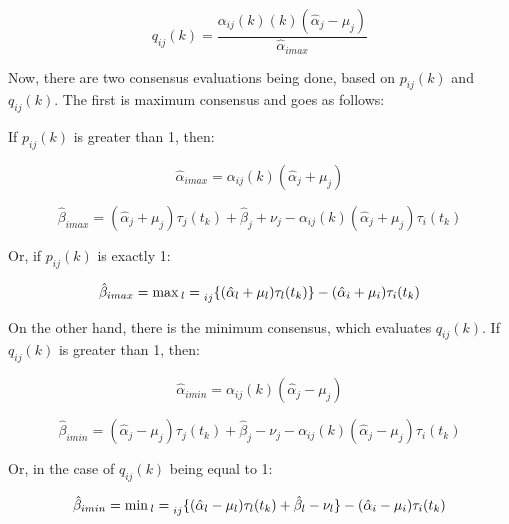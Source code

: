 \documentclass[a4paper,12pt]{article}
\begin{document}
    \begin{equation}
        q_{ij}(k) = \frac{\alpha_{ij}(k) (k) (\hat{\alpha}_j - \mu_j)}{\hat{\alpha}_{imax}}
    \end{equation}
    
    Now, there are two consensus evaluations being done, based on $p_{ij}(k)$ and $q_{ij}(k)$. The first is maximum consensus and goes as follows:
    
    If $p_{ij}(k)$ is greater than 1, then:
    
    \begin{equation}
        \hat{\alpha}_{imax} = \alpha_{ij}(k)(\hat{\alpha}_j + \mu_j)
    \end{equation}
    
    \begin{equation}
        \hat{\beta}_{imax} = (\hat{\alpha}_j + \mu_j) \tau_j(t_k) + \hat{\beta}_j + \nu_j - \alpha_{ij}(k)(\hat{\alpha}_j + \mu_j) \tau_i(t_k)
    \end{equation}
    
    Or, if $p_{ij}(k)$ is exactly 1:
    
    \begin{equation}
        \hat{\beta}_{imax} = \max{_l} = \prescript{}{ij}{\{ ( \hat{\alpha}_l + \mu_l ) \tau_l(t_k) \}} - ( \hat{\alpha}_i + \mu_i ) \tau_i(t_k)
    \end{equation}
    
    On the other hand, there is the minimum consensus, which evaluates $q_{ij}(k)$. If $q_{ij}(k)$ is greater than 1, then:
    
    \begin{equation}
        \hat{\alpha}_{imin} = \alpha_{ij}(k)(\hat{\alpha}_j - \mu_j)
    \end{equation}
    
    \begin{equation}
        \hat{\beta}_{imin} = ( \hat{\alpha}_j - \mu_j ) \tau_j(t_k) + \hat{\beta}_j - \nu_j - \alpha_{ij}(k)(\hat{\alpha}_j - \mu_j)\tau_i(t_k)
    \end{equation}
    
    Or, in the case of $q_{ij}(k)$ being equal to 1:
    
    \begin{equation}
         \hat{\beta}_{imin} = \min{_l} = \prescript{}{ij}{\{ ( \hat{\alpha}_l - \mu_l ) \tau_l(t_k) + \hat{\beta}_l - \nu_l \}} - ( \hat{\alpha}_i - \mu_i ) \tau_i(t_k) 
    \end{equation}
    
\end{document}
